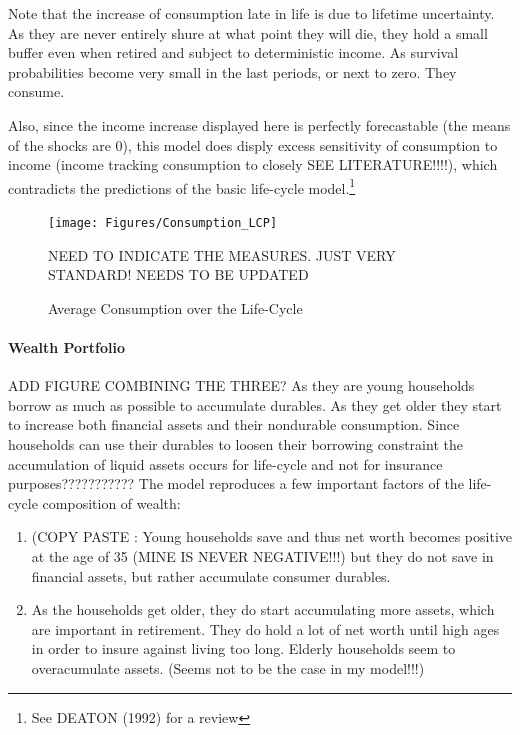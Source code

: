 \documentclass[a4paper,12pt]{article}
\begin{document}
Note that the increase of consumption late in life is due to lifetime uncertainty. As they are never entirely shure at what point they will die, they hold a small buffer even when retired and subject to deterministic income. As survival probabilities become very small in the last periods, or next to zero. They consume. 

Also, since the income increase displayed here is perfectly forecastable (the means of the shocks are 0), this model does disply excess sensitivity of consumption to income (income tracking consumption to closely SEE LITERATURE!!!!), which contradicts the predictions of the 
basic life-cycle model.\footnote{See DEATON (1992) for a review}


\begin{figure}[!htbp]
\caption{Average Consumption over the Life-Cycle} 
\label{Consumption_LCP}	%
\centering
\texttt{[image: Figures/Consumption\_LCP]}  %

\begin{minipage}{0.8\linewidth}
\footnotesize{NEED TO INDICATE THE MEASURES. JUST VERY STANDARD! NEEDS TO BE UPDATED}
\end{minipage}

\end{figure}

\paragraph{Wealth Portfolio}
ADD FIGURE COMBINING THE THREE? 
As they are young households borrow as much as possible to accumulate durables. As they get older they start to increase both financial assets and their nondurable consumption. Since households can use their durables to loosen their borrowing constraint the accumulation of liquid assets occurs for life-cycle and not for insurance purposes???????????
The model reproduces a few important factors of the life-cycle composition of wealth:
\begin{enumerate}
\item (COPY PASTE \citep{FV&K2011}: Young households save and thus net worth becomes positive at the age of 35 (MINE IS NEVER NEGATIVE!!!) but they do not save in financial assets, but rather accumulate consumer durables.
\item As the households get older, they do start accumulating more assets, which are important in retirement. They do hold a lot of net worth until high ages in order to insure against living too long. 
Elderly households seem to overacumulate assets. (Seems not to be the case in my model!!!)
\end{enumerate}
\end{document}
